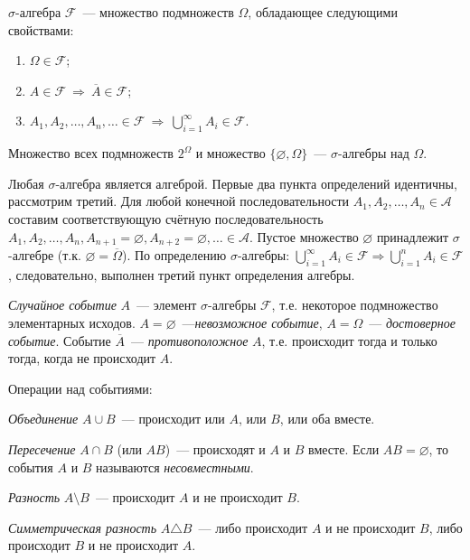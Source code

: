 \begin{defn}
$\sigma \textit{{-алгебра~}} \mathcal{F}$~--- множество подмножеств $\Omega$, обладающее следующими свойствами:

\begin{enumerate}
    \item 
        $\Omega \in \mathcal{F}$;
    \item 
        $A \in \mathcal{F} \: \Rightarrow \: \overline{A} \in \mathcal{F}$;
    \item 
        $A_1, A_2,\ldots, A_n,\ldots \in \mathcal{F} \: \Rightarrow \: \bigcup\limits_{i=1}^\infty A_i \in \mathcal{F}$.
\end{enumerate}
\end{defn}
\begin{exmp}
    Множество всех подмножеств $2^{\Omega}$ и множество $\{\varnothing, \Omega\}$~--- $\sigma$-алгебры над $\Omega$.
\end{exmp}
\begin{rmrk}
    Любая $\sigma \text{-алгебра}$ является алгеброй. 
    Первые два пункта определений идентичны, рассмотрим третий. 
    Для любой конечной последовательности $A_1, A_2,\ldots, A_n \in \mathcal{A}$ составим соответствующую счётную последовательность $A_1, A_2, \ldots, A_n, A_{n+1}=\varnothing, A_{n+2}=\varnothing,\ldots \in \mathcal{A}$. 
    Пустое множество $\varnothing$ принадлежит $\sigma$-алгебре (т.к. $\varnothing = \overline{\Omega}$).
    По определению $\sigma \text{-алгебры}$: $\bigcup\limits_{i=1}^\infty A_i \in \mathcal{F} \Rightarrow \bigcup\limits_{i=1}^n A_i \in \mathcal{F}$, следовательно, выполнен третий пункт определения алгебры.
\end{rmrk}

\begin{defn}
    \textit{Случайное событие} $A$~--- элемент $\sigma \text{-алгебры~} \mathcal{F}$, т.е. некоторое подмножество элементарных исходов. 
    $A=\varnothing$~---\textit{невозможное событие}, $A=\Omega$~--- \textit{достоверное событие}. 
    Событие $\overline{A}$~--- \textit{противоположное} $A$, т.е. происходит тогда и только тогда, когда не происходит $A$.

Операции над событиями:

\begin{compactlist}
    \item 
        \textit{Объединение} $A \cup B$~--- происходит или $A$, или $B$, или оба вместе.
    \item 
        \textit{Пересечение} $A \cap B$ (или $AB$)~--- происходят и $A$ и $B$ вместе. Если $AB = \varnothing$, то события $A$ и $B$ называются \textit{несовместными}.
    \item 
        \textit{Разность} $A \setminus B$~--- происходит $A$ и не происходит $B$.
    \item 
        \textit{Симметрическая разность} $A \triangle B$~--- либо происходит $A$ и не происходит $B$, либо происходит $B$ и не происходит $A$.
\end{compactlist}
\end{defn}

